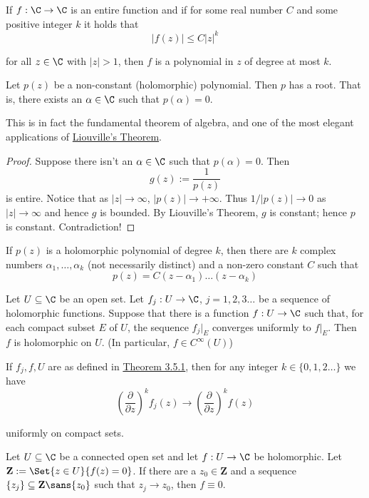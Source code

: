 \label{db4ce28}

If $f:\C\to\C$ is an entire function and if for some real number $C$ and some
positive integer $k$ it holds that
$$
  |f(z)|\leq C|z|^k
$$

for all $z\in\C$ with $|z|>1$, then $f$ is a polynomial in $z$ of degree at
most $k$.

\label{ae3b10d}

Let $p(z)$ be a non-constant (holomorphic) polynomial. Then $p$ has a root.
That is, there exists an $\alpha\in\C$ such that $p(\alpha)=0$.

This is in fact the fundamental theorem of algebra, and one of the most elegant
applications of \href{cf6d8a9}{Liouville's Theorem}.

\begin{proof}
  Suppose there isn't an $\alpha\in\C$ such that $p(\alpha)=0$. Then
  $$
    g(z):=\frac1{p(z)}
  $$
  is entire. Notice that as $|z|\to\infty$, $|p(z)|\to+\infty$. Thus
  $1/|p(z)|\to0$ as $|z|\to\infty$ and hence $g$ is bounded. By Liouville's
  Theorem, $g$ is constant; hence $p$ is constant. Contradiction!
\end{proof}

\label{cae4be0}

If $p(z)$ is a holomorphic polynomial of degree $k$, then there are $k$ complex
numbers $\alpha_1,\ldots,\alpha_k$ (not necessarily distinct) and a non-zero
constant $C$ such that
$$
  p(z)=C(z-\alpha_1)\ldots(z-\alpha_k)
$$

\label{c4e6d08}

Let $U\subseteq\C$ be an open set. Let $f_j:U\to\C$, $j=1,2,3\ldots$ be a
sequence of holomorphic functions. Suppose that there is a function $f:U\to\C$
such that, for each compact subset $E$ of $U$, the sequence $f_j|_E$ converges
uniformly to $f|_E$. Then $f$ is holomorphic on $U$. (In particular, $f\in
C^\infty(U)$)

\label{f5163f1}

If $f_j,f,U$ are as defined in \href{c4e6d08}{Theorem 3.5.1}, then for any
integer $k\in\{0,1,2\ldots\}$ we have
$$
  \left(\frac\partial{\partial z}\right)^kf_j(z)\to\left(\frac\partial{\partial z}\right)^kf(z)
$$

uniformly on compact sets.

\label{bdc2857}

Let $U\subseteq\C$ be a connected open set and let $f:U\to\C$ be holomorphic.
Let $\mathbf Z:=\Set{z\in U}{f(z)=0}$. If there are a $z_0\in\mathbf Z$ and a
sequence $\{z_j\}\subseteq\mathbf Z\sans{z_0}$ such that $z_j\to z_0$, then
$f\equiv0$.

